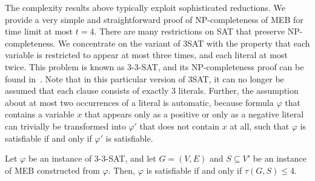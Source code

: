 The complexity results above typically exploit sophisticated reductions.
We provide a very simple and straightforward proof of NP-completeness of MEB for time limit at most $t=4$.
There are many restrictions on SAT that preserve NP-completeness.
We concentrate on the variant of 3SAT with the property that each variable is restricted to appear at most three times, and each literal at most twice. 
This problem is known as 3-3-SAT, and its NP-completeness proof can be found in~\cite{papadimitriou94}. 
Note that in this particular version of 3SAT, it can no longer be assumed that each clause consists of exactly 3 literals.
Further, the assumption about at most two occurrences of a literal is automatic, 
because formula $\varphi$ that contains a variable $x$ that appears only as a positive or only as a negative literal can trivially be transformed into $\varphi'$ that does not contain $x$ at all, 
such that $\varphi$ is satisfiable if and only if $\varphi'$ is satisfiable.
\begin{lemma}\label{lemma:mbtred}
Let $\varphi$ be an instance of \textsc{3-3-SAT}, and let $G=(V,E)$ and $S\subseteq V'$ be an instance of MEB constructed from $\varphi$. 
Then, $\varphi$ is satisfiable if and only if $\tau(G,S)\leq 4$.
\end{lemma}
